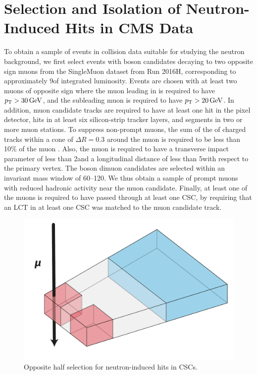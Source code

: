 \section{Selection and Isolation of Neutron-Induced Hits in CMS Data}
\label{sec:selection}
To obtain a sample of events in \pp collision data suitable for studying the neutron background, we first select events with \PZ boson candidates decaying to two opposite sign muons from the SingleMuon dataset from Run 2016H, corresponding to approximately 9\fbinv of integrated luminosity. Events are chosen with at least two muons of opposite sign where the muon leading in \pt is required to have $p_{\mathrm{T}} > 30\,\text{Ge\hspace{-.08em}V}$, and the subleading muon is required to have $p_{\mathrm{T}} > 20\,\text{Ge\hspace{-.08em}V}$. In addition, muon candidate tracks are required to have at least one hit in the pixel detector, hits in at least six silicon-strip tracker layers, and segments in two or more muon stations. To suppress non-prompt muons, the sum of the \pt of charged tracks within a cone of $\Delta R=0.3$ around the muon is required to be less than 10\% of the muon \pt. Also, the muon is required to have a transverse impact parameter of less than 2\mm and a longitudinal distance of less than 5\mm with respect to the primary vertex. The \PZ boson dimuon candidates are selected within an invariant mass window of 60--120\GeV. We thus obtain a sample of prompt muons with reduced hadronic activity near the muon candidate. Finally, at least one of the muons is required to have passed through at least one CSC, by requiring that an LCT in at least one CSC was matched to the muon candidate track. 

\begin{figure}[htbp]
	\centering
	\includegraphics[width=\dummyFigWidth]{figures/neutron/CornerSelection.pdf}
	\caption{Opposite half selection for neutron-induced hits in CSCs.}
	\label{fig:corner}
\end{figure}

